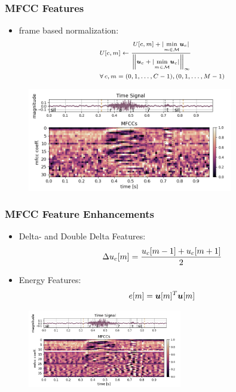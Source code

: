 \begin{frame}
  \frametitle{MFCC Features}
  \vspace{-1cm}
  \begin{itemize}
    \item frame based normalization:
    \begin{equation*}
      \scriptsize
      \begin{aligned}
        &U[c, m] \gets \frac{U[c, m] + \vert \underset{m \in \mathcal{M}}{\min} \bm{u}_c \vert}{\norm{\bm{u}_c + \vert \underset{m \in \mathcal{M}}{\min} \bm{u}_c \vert}_\infty}\\
        & \forall \, c, m = (0, 1, \dots, C - 1), (0, 1, \dots, M - 1)
      \end{aligned}
    \end{equation*}
  \end{itemize}
  \vspace{-0.25cm}
  \begin{figure} \includegraphics[width=0.8\textwidth]{../3_signal/figs/signal_mfcc_showcase_mfcc32_right0.png} \end{figure}
\end{frame}

\begin{frame}
  \frametitle{MFCC Feature Enhancements}
  \vspace{-1cm}
  \begin{itemize}
    \item Delta- and Double Delta Features:
    \begin{equation*}\label{eq:signal_mfcc_delta}
      \scriptsize
      \Delta u_c[m] = \frac{u_c[m - 1] + u_c[m + 1]}{2}
    \end{equation*}
    \item Energy Features:
    \begin{equation*}
      \scriptsize
      e[m] = \bm{u}[m]^T \bm{u}[m]
    \end{equation*}
  \end{itemize}
  \begin{figure} \includegraphics[width=0.6\textwidth]{../3_signal/figs/signal_mfcc_showcase_mfcc39_right0.png} \end{figure}
\end{frame}


